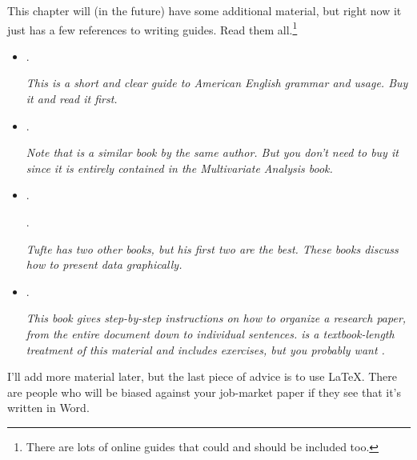 \begin{itemize}[leftmargin=0pt]
  This chapter will (in the future) have some additional material, but
  right now it just has a few references to writing guides. Read them
  all.\footnote{There are lots of online guides that could and should
    be included too.}

  \begin{itemize}
  \item {}.

    \emph{This is a short and clear guide to American English grammar
      and usage. Buy it and read it first.}

  \item {}.

    \emph{Note that \citet{Mil04} is a similar book by the same
      author.  But you don't need to buy it since it is entirely
      contained in the \emph{Multivariate Analysis} book.}

  \item {}.

    .

    \emph{Tufte has two other books, but his first two are the
      best. These books discuss how to present data graphically.}

  \item {}.

    \emph{This book gives step-by-step instructions on how to organize
      a research paper, from the entire document down to individual
      sentences. \citet{WiC10b} is a textbook-length treatment of this
      material and includes exercises, but you probably want
      \citet{WiC10}.}

  \end{itemize}

  I'll add more material later, but the last piece of advice is to use
  LaTeX. There are people who will be biased against your job-market
  paper if they see that it's written in Word.

\end{itemize}


